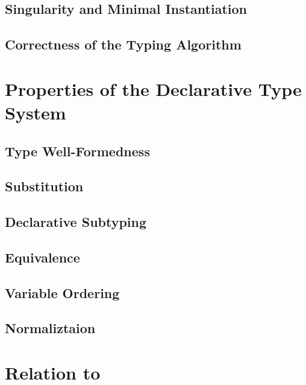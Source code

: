 \documentclass[acmsmall,natbib=false,review,anonymous]{acmart}
\newcommand{\genDir}{_gen}
\begin{document}
\subsection{Singularity and Minimal Instantiation}


\subsection{Correctness of the Typing Algorithm}




\section{Properties of the Declarative Type System}

\subsection{Type Well-Formedness}


\subsection{Substitution}


\subsection{Declarative Subtyping}


\subsection{Equivalence}
\label{sec:decl-equiv-lemmas}


\subsection{Variable Ordering}


\subsection{Normaliztaion}


\section{Relation to \systemf}

\end{document}
